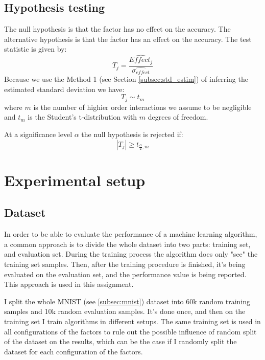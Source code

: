 \documentclass{article}
\begin{document}
\subsection{Hypothesis testing}
\label{subsec:hypothesis_testing}

The null hypothesis is that the factor has no effect on the accuracy. The alternative hypothesis is that the factor has an effect on the accuracy. The test statistic is given by:
\begin{equation}
    T_j = \frac{\widehat{Effect_j}}{\widehat{\sigma_{effect}}}
\end{equation}
Because we use the Method 1 (see Section \ref{subsec:std_estim}) of inferring the estimated standard deviation we have:
\begin{equation}
    T_j \sim t_{m}
\end{equation}
where $m$ is the number of highier order interactions we assume to be negligible and $t_{m}$ is the Student's t-distribution with $m$ degrees of freedom.

At a significance level $\alpha$ the null hypothesis is rejected if:
\begin{equation}
    |T_j| \geq t_{\frac{\alpha}{2}, m}
\end{equation}

\section{Experimental setup}

\subsection{Dataset}
\label{subsec:dataset}
In order to be able to evaluate the performance of a machine learning algorithm, a common approach is to divide the whole dataset into two parts: training set, and evaluation set. During the training process the algorithm does only "see" the training set samples. Then, after the training procedure is finished, it's being evaluated on the evaluation set, and the performance value is being reported. This approach is used in this assignment.

I split the whole MNIST (see \ref{subsec:mnist}) dataset into 60k random training samples and 10k random evaluation samples. It's done once, and then on the training set I train algorithms in different setups. The same training set is used in all configurations of the factors to rule out the possible influence of random split of the dataset on the results, which can be the case if I randomly split the dataset for each configuration of the factors.
\end{document}
